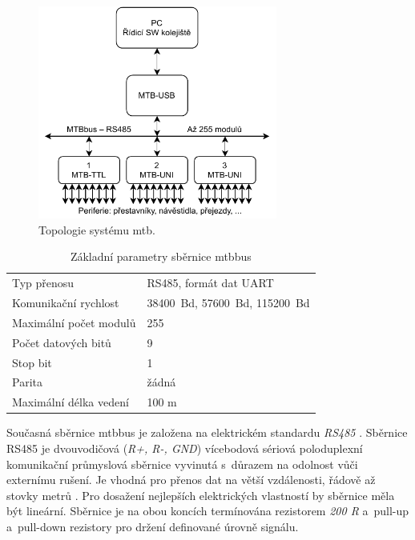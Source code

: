 \begin{figure}[ht]
\includegraphics[width=0.7\textwidth]{data/mtb-topology.pdf}
\caption{Topologie systému \gls{mtb}.}
\label{fig:mtbbus-topology}
\end{figure}

\begin{table}[h]
	\begin{tabularx}{\textwidth}{XX}
		\toprule
		Typ přenosu & RS485, formát dat UART \\
		Komunikační rychlost & 38400~Bd, 57600~Bd, 115200~Bd \\
		Maximální počet modulů & 255 \\
		Počet datových bitů & 9 \\
		Stop bit & 1 \\
		Parita & žádná \\
		Maximální délka vedení & 100 m \\
		\bottomrule
	\end{tabularx}
	\caption{Základní parametry sběrnice \gls{mtbbus} \cite{mtbbus-specs}}
	\label{tab:mtbbus-params}
\end{table}

Současná sběrnice \gls{mtbbus} je založena na elektrickém standardu
\textit{RS485} \cite{mtbbus-specs}. Sběrnice RS485 je dvouvodičová (\textit{R+,
R-, GND}) vícebodová sériová poloduplexní komunikační průmyslová sběrnice
vyvinutá s~důrazem na odolnost vůči externímu rušení. Je vhodná pro přenos dat
na větší vzdálenosti, řádově až stovky metrů \cite{rs485-specs}. Pro dosažení
nejlepších elektrických vlastností by sběrnice měla být lineární. Sběrnice je
na obou koncích termínována rezistorem \textit{200 R} a~pull-up a~pull-down
rezistory pro držení definované úrovně signálu.

